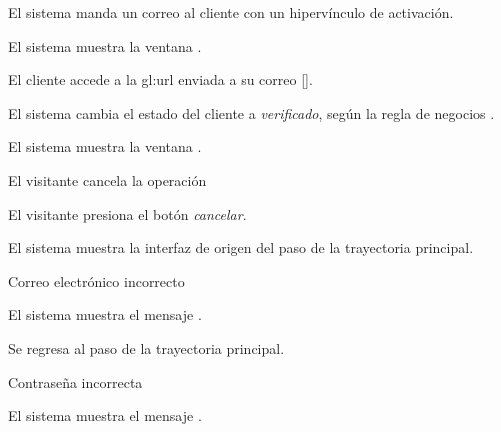 {\begin{trayectoriaPrincipal}
    \item El sistema manda un correo al cliente con un hipervínculo de
      activación.

    \item El sistema muestra la ventana
      .

    \item El cliente accede a la \gls{gl:url} enviada a su correo
      [].

    \item El sistema cambia el estado del cliente a \textit{verificado},
      según la regla de negocios .

    \item El sistema muestra la ventana
      .

  \end{trayectoriaPrincipal}

  \begin{trayectoriaAlternativa}[ta:cancelar]
    {El visitante cancela la operación}

    \item El visitante presiona el botón \textit{cancelar}.

    \item El sistema muestra la interfaz de origen del paso
       de la trayectoria principal.

  \end{trayectoriaAlternativa}

  \begin{trayectoriaAlternativa}
    {Correo electrónico incorrecto}

    \item El sistema muestra el mensaje .

    \item Se regresa al paso  de la trayectoria
      principal.

  \end{trayectoriaAlternativa}

  \begin{trayectoriaAlternativa}
    {Contraseña incorrecta}

    \item El sistema muestra el mensaje
      .


\end{trayectoriaAlternativa}}
